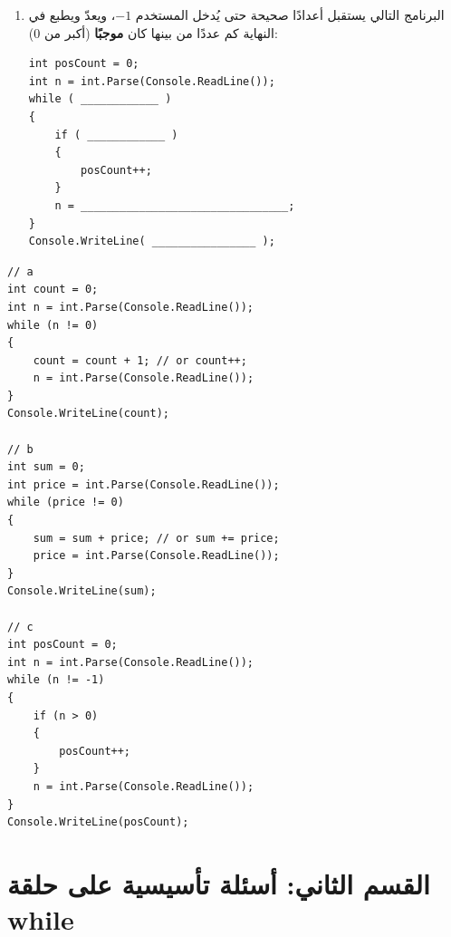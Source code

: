 \documentclass[14pt]{extarticle}
\begin{document}
\begin{enumerate}[itemsep=2em]
\begin{enumerate}
    \item البرنامج التالي يستقبل أعدادًا صحيحة حتى يُدخل المستخدم $-1$، ويعدّ ويطبع في النهاية كم عددًا من بينها كان \textbf{موجبًا} (أكبر من $0$):
\begin{boxCode}
\begin{english}
\begin{verbatim}
int posCount = 0;
int n = int.Parse(Console.ReadLine());
while ( ____________ )
{
    if ( ____________ )
    {
        posCount++;
    }
    n = ________________________________;
}
Console.WriteLine( ________________ );
\end{verbatim}
\end{english}
\end{boxCode}
\end{enumerate}
\ifwithsols
\begin{boxSolution}
\begin{english}
\begin{verbatim}
// a
int count = 0;
int n = int.Parse(Console.ReadLine());
while (n != 0)
{
    count = count + 1; // or count++;
    n = int.Parse(Console.ReadLine());
}
Console.WriteLine(count);

// b
int sum = 0;
int price = int.Parse(Console.ReadLine());
while (price != 0)
{
    sum = sum + price; // or sum += price;
    price = int.Parse(Console.ReadLine());
}
Console.WriteLine(sum);

// c
int posCount = 0;
int n = int.Parse(Console.ReadLine());
while (n != -1)
{
    if (n > 0)
    {
        posCount++;
    }
    n = int.Parse(Console.ReadLine());
}
Console.WriteLine(posCount);
\end{verbatim}
\end{english}
\end{boxSolution}
\fi
\filbreak

\end{enumerate}

\clearpage
\section*{القسم الثاني: أسئلة تأسيسية على حلقة \textenglish{while}}
\end{document}
